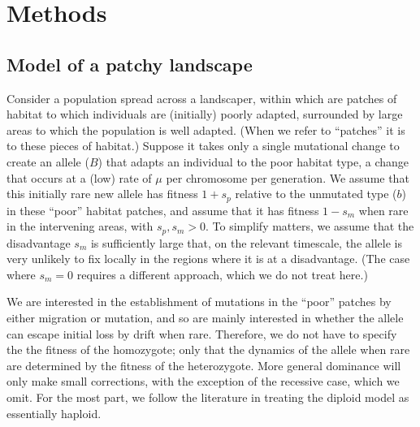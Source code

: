\documentclass{article}
\begin{document}





\section{Methods}

\subsection{Model of a patchy landscape}
\label{ss:patchyspace}

Consider a population spread across a landscaper, 
within which are patches of habitat to which individuals are (initially) poorly adapted,
surrounded by large areas to which the population is well adapted.
(When we refer to ``patches'' it is to these pieces of habitat.)
Suppose it takes only a single mutational change to create an allele ($B$) that adapts an individual to the poor habitat type, 
a change that occurs at a (low) rate of $\mu$ per chromosome per generation. 
We assume that this initially rare new
allele has fitness $1+s_p$ relative to the unmutated type ($b$) in these ``poor'' habitat patches,
and assume that it has fitness $1-s_m$ when rare in the intervening areas, with $s_p, s_m > 0$.
To simplify matters, we assume that the disadvantage $s_m$ 
is sufficiently large that, on the relevant timescale,
the allele is very unlikely to fix locally in the regions where it is at a disadvantage.
(The case where $s_m=0$ requires a different approach, which we do not treat here.)

We are interested in the establishment of mutations in the ``poor'' patches by either
migration or mutation, and so are mainly interested in whether the allele
can escape initial loss by drift when rare. 
Therefore, we do not have to specify the the fitness of the homozygote; 
only that the dynamics of the allele when rare 
are determined by the fitness of the heterozygote. 
More general dominance will only make small corrections,
with the exception of the recessive case, which we omit.
For the most part, 
we follow the literature in treating the diploid model as essentially haploid.
\end{document}
